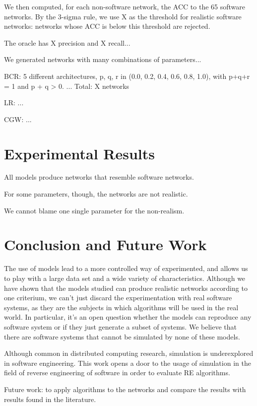 We then computed, for each non-software network, the ACC to the 65 software
networks. By the 3-sigma rule, we use X as the threshold for realistic software
networks: networks whose ACC is below this threshold are rejected.

The oracle has X precision and X recall...


We generated networks with many combinations of parameters...

BCR: 5 different architectures, 
p, q, r in (0.0, 0.2, 0.4, 0.6, 0.8, 1.0), with p+q+r = 1 and p + q > 0.
...
Total: X networks

LR: ...

CGW: ...

\section{Experimental Results}

All models produce networks that resemble software networks.

For some parameters, though, the networks are not realistic.

We cannot blame one single parameter for the non-realism.

\section{Conclusion and Future Work}

The use of models lead to a more controlled way of experimented, and allows us
to play with a large data set and a wide variety of characteristics. Although
we have shown that the models studied can produce realistic networks according
to one criterium, we can't just discard the experimentation with real software
systems, as they are the subjects in which algorithms will be used in the
real world. In particular, it's an open question whether the models can 
reproduce any software system or if they just generate a subset of systems.
We believe that there are software systems that cannot be simulated by none
of these models.

Although common in distributed computing research, simulation is underexplored
in software engineering. This work opens a door to the usage of simulation in
the field of reverse engineering of software in order to evaluate RE 
algorithms.

Future work: to apply algorithms to the networks and compare the results with
results found in the literature.

